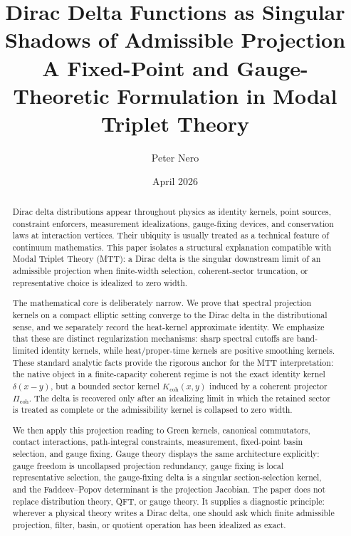 \documentclass[11pt]{article}
\title{\Large Dirac Delta Functions as Singular Shadows of Admissible Projection\\
\large A Fixed-Point and Gauge-Theoretic Formulation in Modal Triplet Theory}
\author{Peter Nero}
\date{April 2026}
\begin{document}
\maketitle
\seriestagline

\begin{abstract}
Dirac delta distributions appear throughout physics as identity kernels, point sources,
constraint enforcers, measurement idealizations, gauge-fixing devices, and conservation
laws at interaction vertices. Their ubiquity is usually treated as a technical feature of
continuum mathematics. This paper isolates a structural explanation compatible with
Modal Triplet Theory (MTT): a Dirac delta is the singular downstream limit of an
admissible projection when finite-width selection, coherent-sector truncation, or
representative choice is idealized to zero width.

The mathematical core is deliberately narrow. We prove that spectral projection kernels
on a compact elliptic setting converge to the Dirac delta in the distributional sense, and
we separately record the heat-kernel approximate identity. We emphasize that these are
distinct regularization mechanisms: sharp spectral cutoffs are band-limited identity
kernels, while heat/proper-time kernels are positive smoothing kernels. These standard
analytic facts provide the rigorous anchor for the MTT interpretation: the native object
in a finite-capacity coherent regime is not the exact identity kernel \(\delta(x-y)\), but
a bounded sector kernel \(K_{\mathrm{coh}}(x,y)\) induced by a coherent projector
\(\Pi_{\mathrm{coh}}\). The delta is recovered only after an idealizing limit in which the
retained sector is treated as complete or the admissibility kernel is collapsed to zero
width.

We then apply this projection reading to Green kernels, canonical commutators, contact
interactions, path-integral constraints, measurement, fixed-point basin selection, and
gauge fixing. Gauge theory displays the same architecture explicitly: gauge freedom is
uncollapsed projection redundancy, gauge fixing is local representative selection, the
gauge-fixing delta is a singular section-selection kernel, and the Faddeev--Popov
determinant is the projection Jacobian. The paper does not replace distribution theory,
QFT, or gauge theory. It supplies a diagnostic principle: wherever a physical theory writes
a Dirac delta, one should ask which finite admissible projection, filter, basin, or quotient
operation has been idealized as exact.
\end{abstract}
\end{document}
